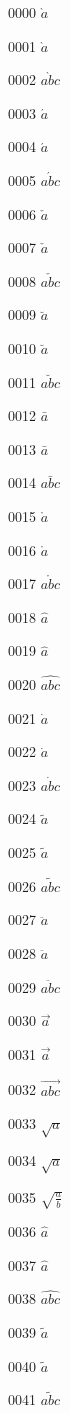\documentclass{article}
\begin{document}
0000 $\grave{a}$\par
0001 $\displaystyle\grave{a}$\par
0002 $\grave{abc}$\par
0003 $\acute{a}$\par
0004 $\displaystyle\acute{a}$\par
0005 $\acute{abc}$\par
0006 $\check{a}$\par
0007 $\displaystyle\check{a}$\par
0008 $\check{abc}$\par
0009 $\breve{a}$\par
0010 $\displaystyle\breve{a}$\par
0011 $\breve{abc}$\par
0012 $\bar{a}$\par
0013 $\displaystyle\bar{a}$\par
0014 $\bar{abc}$\par
0015 $\mathring{a}$\par
0016 $\displaystyle\mathring{a}$\par
0017 $\mathring{abc}$\par
0018 $\hat{a}$\par
0019 $\displaystyle\hat{a}$\par
0020 $\hat{abc}$\par
0021 $\dot{a}$\par
0022 $\displaystyle\dot{a}$\par
0023 $\dot{abc}$\par
0024 $\tilde{a}$\par
0025 $\displaystyle\tilde{a}$\par
0026 $\tilde{abc}$\par
0027 $\ddot{a}$\par
0028 $\displaystyle\ddot{a}$\par
0029 $\ddot{abc}$\par
0030 $\vec{a}$\par
0031 $\displaystyle\vec{a}$\par
0032 $\vec{abc}$\par
0033 $\sqrt{a}$\par
0034 $\displaystyle\sqrt{a}$\par
0035 $\sqrt{\frac{a}{b}}$\par
0036 $\widehat{a}$\par
0037 $\displaystyle\widehat{a}$\par
0038 $\widehat{abc}$\par
0039 $\widetilde{a}$\par
0040 $\displaystyle\widetilde{a}$\par
0041 $\widetilde{abc}$\par
\end{document}
